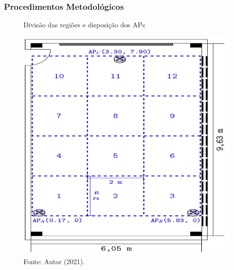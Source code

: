 \documentclass[xcolor={dvipsnames,svgnames,table}]{beamer}
\begin{document}
	\begin{frame}
		\frametitle{Procedimentos Metodológicos}	
		\begin{figure}
			\caption{Divisão das regiões e disposição dos APs}
			\vspace{-5pt}
			\centering
			\includegraphics[width=0.55\linewidth]{imgs/mapeamento.PNG}
			\vspace{-5pt}
			\caption*{\tiny{Fonte: Autor (2021).}}
		\end{figure}
	\end{frame}
\end{document}
